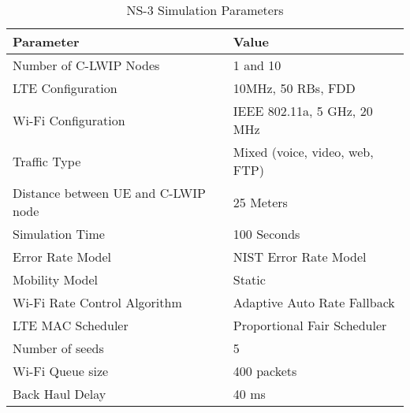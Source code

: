 \documentclass[conference]{IEEEtran}
\begin{document}
\begin{table}[b]
\centering
\vspace{-0.4cm}
\caption{NS-3 Simulation Parameters}
\renewcommand{\arraystretch}{1.2}

\begin{tabular}{|l|l|} \hline 
\label{tab:config}
\textbf{\hspace{1cm}Parameter} & \textbf{\hspace{1cm}Value}\\ [0.7ex]\hline \hline
Number of C-LWIP Nodes & 1 and 10 \\ \hline
LTE Configuration  & 10MHz, 50 RBs, FDD \\ \hline
Wi-Fi Configuration & IEEE 802.11a, 5 GHz, 20 MHz \\ \hline
Traffic Type & Mixed (voice, video, web, FTP) \\ \hline
Distance between UE and C-LWIP node & 25 Meters\\ \hline
Simulation Time & 100 Seconds\\ \hline
Error Rate Model & NIST Error Rate Model\\ \hline
Mobility Model & Static \\ \hline
Wi-Fi Rate Control Algorithm & Adaptive Auto Rate Fallback\\ \hline
LTE MAC Scheduler & Proportional Fair Scheduler\\ \hline
Number of seeds & 5\\ \hline
Wi-Fi Queue size & 400 packets\\ \hline
Back Haul Delay & 40 ms\\ \hline
\end{tabular}
\end{table}
\end{document}

